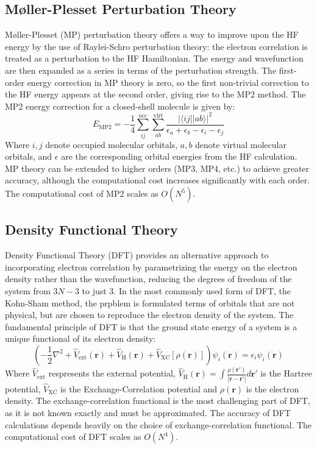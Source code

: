 \subsection{Møller-Plesset Perturbation Theory}
Møller-Plesset (MP) perturbation theory offers a way to improve upon the HF energy by the use of Raylei-Schro perturbation theory: the electron correlation is treated as a perturbation to the HF Hamiltonian. The energy and wavefunction are then expanded as a series in terms of the perturbation strength. The first-order energy correction in MP theory is zero, so the first non-trivial correction to the HF energy appears at the second order, giving rise to the MP2 method. The MP2 energy correction for a closed-shell molecule is given by:
\begin{equation} \label{eq:MP2}
    E_{\mathrm{MP2}} = - \frac{1}{4} \sum_{ij}^{\mathrm{occ}} \sum_{ab}^{\mathrm{virt}} \frac{|\langle i j || a b \rangle|^2}{\epsilon_a + \epsilon_b - \epsilon_i - \epsilon_j}
\end{equation}
Where $i,j$ denote occupied molecular orbitals, $a,b$ denote virtual molecular orbitals, and $\epsilon$ are the corresponding orbital energies from the HF calculation. MP theory can be extended to higher orders (MP3, MP4, etc.) to achieve greater accuracy, although the computational cost increases significantly with each order. The computational cost of MP2 scales as $O(N^5)$.

\subsection{Density Functional Theory}
Density Functional Theory (DFT) provides an alternative approach to incorporating electron correlation by parametrizing the energy on the electron density rather than the wavefunction, reducing the degrees of freedom of the system from $3N-3$ to just $3$. In the most commonly used form of DFT, the Kohn-Sham method, the prpblem is formulated terms of orbitals that are not physical, but are chosen to reproduce the electron density of the system. The fundamental principle of DFT is that the ground state energy of a system is a unique functional of its electron density:
\begin{equation}\label{eq:KSDFT}
    \left( -\frac{1}{2} \nabla^2 + \hat{V}_{\mathrm{ext}}(\mathbf{r}) + \hat{V}_\mathrm{H}(\mathbf{r}) + \hat{V}_{\mathrm{XC}}[\rho(\mathbf{r})] \right) \psi_i(\mathbf{r}) = \epsilon_i \psi_i(\mathbf{r})
\end{equation}
Where $\hat{V}_{\mathrm{ext}}$ respresents the external potential, $\hat{V}_\mathrm{H}(\mathbf{r}) = \int \frac{\rho(\mathbf{r}')}{|\mathbf{r} - \mathbf{r}'|} d\mathbf{r}'$ is the Hartree potential, $\hat{V}_{\mathrm{XC}}$ is the Exchange-Correlation potential and $\rho(\mathbf{r})$ is the electron density. The exchange-correlation functional is the most challenging part of DFT, as it is not known exactly and must be approximated. The accuracy of DFT calculations depends heavily on the choice of exchange-correlation functional. The computational cost of DFT scales as $O(N^4)$.

